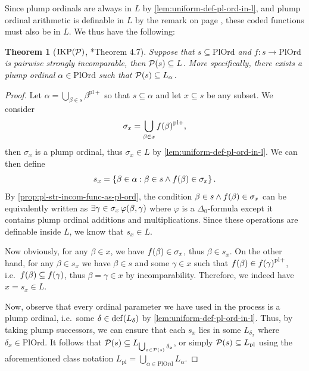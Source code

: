 \documentclass[12pt,openany]{book}
\theoremstyle{plain}
\newtheorem{theorem}{Theorem}[section]
\theoremstyle{definition}
\newcommand\opE[1]{\mathop{\exists #1}}
\newcommand\Pow{\mathcal{P}}
\DeclareMathOperator\dd{def}
\newcommand\IKPP{\mathrm{IKP}\mleft(\Pow\mright)}
\newcommand\PlOrd{\mathrm{PlOrd}}
\newcommand\pl{\mathrm{pl}}
\newcommand\pls{{\pl +}}
\begin{document}
Since plump ordinals are always in $L$ by \autoref{lem:uniform-def-pl-ord-in-l}, and plump ordinal arithmetic is definable in $L$ by the remark on page \pageref{loc:l-pl-rec-impl-remark}, these coded functions must also be in $L$. We thus have the following:
\begin{theorem}[$\IKPP$, \cite{wang-sw26-plump}*{Theorem 4.7}]
  \label{thm:pl-str-incom-code-power}
  Suppose that $s \subseteq \PlOrd$ and $f : s \rightarrow \PlOrd$ is pairwise strongly incomparable, then $\Pow\mleft(s\mright) \subseteq L$. More specifically, there exists a plump ordinal $\alpha \in \PlOrd$ such that $\Pow\mleft(s\mright) \subseteq L_\alpha$.
\end{theorem}

\begin{proof}
  Let $\alpha = \bigcup_{\beta \in s} \beta^\pls$ so that $s \subseteq \alpha$ and let $x \subseteq s$ be any subset. We consider
  \[\sigma_x = \bigcup_{\beta \in x} f\mleft(\beta\mright)^\pls,\]
  then $\sigma_x$ is a plump ordinal, thus $\sigma_x \in L$ by \autoref{lem:uniform-def-pl-ord-in-l}. We can then define
  \[s_x = \left\{\beta \in \alpha : \beta \in s \land f\mleft(\beta\mright) \in \sigma_x\right\}.\]
  By \autoref{prop:pl-str-incom-func-as-pl-ord}, the condition $\beta \in s \land f\mleft(\beta\mright) \in \sigma_x$ can be equivalently written as $\opE{\gamma \in \sigma_x} \varphi\mleft(\beta, \gamma\mright)$ where $\varphi$ is a $\Delta_0$-formula except it contains plump ordinal additions and multiplications. Since these operations are definable inside $L$, we know that $s_x \in L$.

  Now obviously, for any $\beta \in x$, we have $f\mleft(\beta\mright) \in \sigma_x$, thus $\beta \in s_x$. On the other hand, for any $\beta \in s_x$ we have $\beta \in s$ and some $\gamma \in x$ such that $f\mleft(\beta\mright) \in f\mleft(\gamma\mright)^\pls$, i.e.\ $f\mleft(\beta\mright) \subseteq f\mleft(\gamma\mright)$, thus $\beta = \gamma \in x$ by incomparability. Therefore, we indeed have $x = s_x \in L$.

  Now, observe that every ordinal parameter we have used in the process is a plump ordinal, i.e.\ some $\delta \in \dd\mleft(L_\delta\mright)$ by \autoref{lem:uniform-def-pl-ord-in-l}. Thus, by taking plump successors, we can ensure that each $s_x$ lies in some $L_{\delta_x}$ where $\delta_x \in \PlOrd$. It follows that $\Pow\mleft(s\mright) \subseteq L_{\bigcup_{x \in \Pow\mleft(s\mright)} \delta_x}$, or simply $\Pow\mleft(s\mright) \subseteq L_\pl$ using the aforementioned class notation $L_\pl = \bigcup_{\alpha \in \PlOrd} L_\alpha$.
\end{proof}
\end{document}
